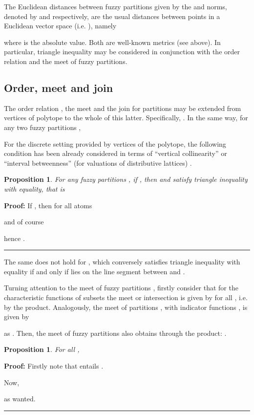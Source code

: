 \documentclass[a4paper,10pt]{article}
\newtheorem{proposition}[theorem]{Proposition}
\newenvironment{proof}[1][Proof]{\noindent\textbf{#1: }}{\ \rule{0.5em}{0.5em}}
\begin{document}
The Euclidean distances between fuzzy partitions  given by the  and  norms, denoted by  and  respectively,
are the usual distances between points in a Euclidean vector space (i.e. ), namely

where  is the absolute value. Both are well-known metrics (see above). In particular, triangle inequality
may be considered in conjunction with the order relation and the meet of fuzzy partitions.

\subsection{Order, meet and join}
The order relation , the meet  and the join  for partitions  may be extended from vertices  of polytope 
to the whole of this latter. Specifically, . In the same way,
for any two fuzzy partitions ,

For the discrete setting provided by vertices of the polytope, the following condition has been already considered in terms of ``vertical collinearity'' \cite{Meila2007} or
``interval betweenness'' (for valuations of distributive lattices) \cite{Monjardet1981}.

\begin{proposition}
For any fuzzy partitions , if , then  and  satisfy triangle inequality with equality, that is

\end{proposition}

\begin{proof}
If , then for all atoms 

and of course

hence .
\end{proof}

The same does not hold for , which conversely satisfies triangle inequality with equality if and only if  lies on the line segment between  and .

Turning attention to the meet  of fuzzy partitions , firstly consider that for the characteristic functions 
of subsets the meet or intersection is given by  for all , i.e. by the product. Analogously, the meet of partitions
, with indicator functions , is given by

as . Then, the meet  of fuzzy partitions  also obtains through the product:
.

\begin{proposition}
For all ,

\end{proposition}

\begin{proof}
Firstly note that  entails .

Now, 

 as wanted.
\end{proof}
\end{document}
